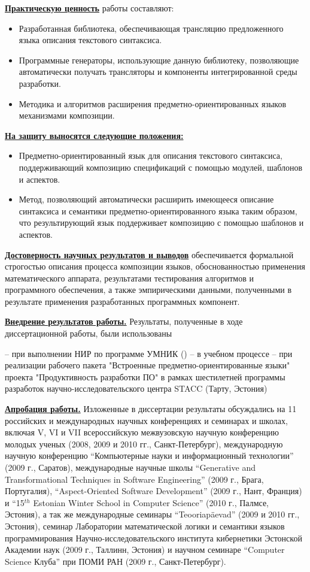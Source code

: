 \documentclass[12pt,a4paper]{article}
\theoremstyle{definition}
\theoremstyle{plain}
\newcommand{\afsubsection}[1]{\par \textbf{\underline{#1}}}
\begin{document}
\afsubsection{Практическую ценность} работы составляют:
\begin{itemize}
\item Разработанная библиотека, обеспечивающая трансляцию предложенного языка описания текстового синтаксиса.
\item Программные генераторы, использующие данную библиотеку, позволяющие автоматически получать трансляторы и компоненты интегрированной среды разработки.
\item Методика и алгоритмов расширения предметно-ориентированных языков механизмами композиции.
\end{itemize}

\afsubsection{На защиту выносятся следующие положения:} 
\begin{itemize}
\item Предметно-ориентированный язык для описания текстового синтаксиса, поддерживающий композицию спецификаций с помощью модулей, шаблонов и аспектов.
\item Метод, позволяющий автоматически расширить имеющееся описание синтаксиса и семантики предметно-ориентированного языка таким образом, что результирующий язык поддерживает композицию с помощью шаблонов и аспектов.
\end{itemize}

\afsubsection{Достоверность научных результатов и выводов} обеспечивается формальной строгостью описания процесса композиции языков, обоснованностью применения математического аппарата, результатами тестирования алгоритмов и программного обеспечения, а также эмпирическими данными, полученными в результате применения разработанных программных компонент.

\afsubsection{Внедрение результатов работы.} Результаты, полученные в ходе диссертационной работы, были использованы 

-- при выполнении НИР по программе УМНИК ()
-- в учебном процессе 
-- при реализации рабочего пакета "Встроенные предметно-ориентированные языки" проекта "Продуктивность разработки ПО" в рамках шестилетней программы разработок научно-исследовательского центра STACC (Тарту, Эстония)

\afsubsection{Апробация работы.} Изложенные в диссертации результаты обсуждались на 11 российских и международных научных конференциях и семинарах и школах, включая V, VI и VII всероссийскую межвузовскую научную конференцию молодых ученых (2008, 2009 и 2010 гг., Санкт-Петербург), международную научную конференцию ``Компьютерные науки и информационный технологии'' (2009 г., Саратов), международные научные школы ``Generative and Transformational Techniques in Software Engineering'' (2009 г., Брага, Португалия), ``Aspect-Oriented Software Development'' (2009 г., Нант, Франция) и ``15$^{th}$ Estonian Winter School in Computer Science'' (2010 г., Палмсе, Эстония), а так же международные семинары ``Teooriapäevad'' (2009 и 2010 гг., Эстония), семинар Лаборатории математической логики и семантики языков программирования Научно-исследовательского института кибернетики Эстонской Академии наук (2009 г., Таллинн, Эстония) и научном семинаре ``Computer Science Клуба'' при ПОМИ РАН (2009 г., Санкт-Петербург).
\end{document}
